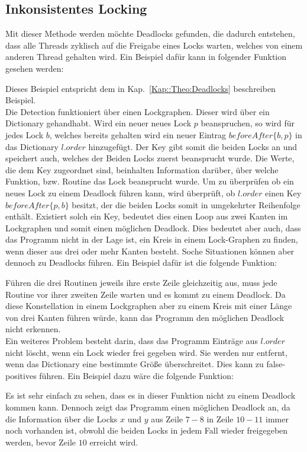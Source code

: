 \subsection{Inkonsistentes Locking}\label{Kap::Rev:Inconsistent}
Mit dieser Methode werden möchte Deadlocks gefunden, die dadurch entstehen,
dass alle Threads zyklisch auf die Freigabe eines Locks warten, welches von 
einem anderen Thread gehalten wird. Ein Beispiel dafür kann in folgender Funktion
gesehen werden:
\begin{figure}[H]
    
\end{figure}
Dieses Beispiel entspricht dem in Kap.~\ref*{Kap::Theo:Deadlocks} beschreiben 
Beispiel.\\
Die Detection funktioniert über einen Lockgraphen. Dieser wird über ein 
Dictionary gehandhabt. Wird ein neuer neues Lock $p$ beanspruchen, so wird für 
jedes Lock $b$, welches bereits gehalten wird ein  
neuer Eintrag $beforeAfter\{b, p\}$ in das Dictionary $l.order$ hinzugefügt. 
Der Key gibt somit die beiden Locks an und speichert auch, welches der Beiden Locks
zuerst beansprucht wurde. Die Werte, die dem Key zugeordnet sind, beinhalten 
Information darüber, über welche Funktion, bzw. Routine das Lock beansprucht wurde.
Um zu überprüfen ob ein neues Lock zu einem Deadlock führen kann, wird überprüft,
ob $l.order$ einen Key $beforeAfter\{p, b\}$ besitzt, der die beiden Locks somit in 
umgekehrter Reihenfolge enthält. Existiert solch ein Key, bedeutet dies einen 
Loop aus zwei Kanten im Lockgraphen und somit einen möglichen Deadlock. 
Dies bedeutet aber auch, dass das Programm nicht in der Lage ist, ein Kreis 
in einem Lock-Graphen zu finden, wenn dieser aus drei oder mehr Kanten besteht.
Soche Situationen können aber dennoch zu Deadlocks führen. Ein Beispiel dafür 
ist die folgende Funktion:
\begin{figure}[H]
    
\end{figure}
Führen die drei Routinen jeweils ihre erste Zeile gleichzeitig aus, muss jede 
Routine vor ihrer zweiten Zeile warten und es kommt zu einem Deadlock. Da diese
Konstellation in einem Lockgraphen aber zu einem Kreis mit einer Länge von drei 
Kanten führen würde, kann das Programm den möglichen Deadlock nicht erkennen.\\
Ein weiteres Problem besteht darin, dass das Programm Einträge aus $l.order$ nicht 
löscht, wenn ein Lock wieder frei gegeben wird. Sie werden nur entfernt, wenn 
das Dictionary eine bestimmte Größe überschreitet. Dies kann zu false-positives
führen. Ein Beispiel dazu wäre die folgende Funktion:  
\begin{figure}[H]
    
\end{figure}
Es ist sehr einfach zu sehen, dass es in dieser Funktion nicht zu einem Deadlock 
kommen kann. Dennoch zeigt das Programm einen möglichen Deadlock an, da die 
Information über die Locks $x$ und $y$ aus Zeile $7-8$ in Zeile $10-11$ immer 
noch vorhanden ist, obwohl die beiden Locks in jedem Fall wieder freigegeben
werden, bevor Zeile $10$ erreicht wird.



